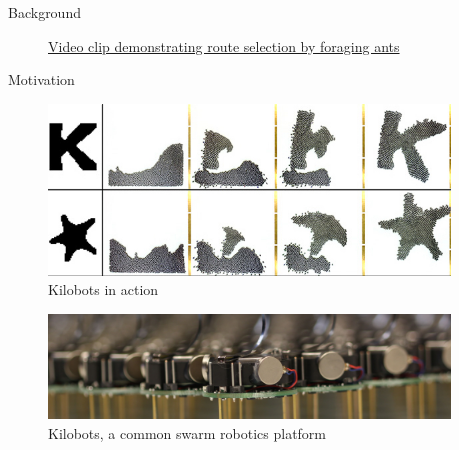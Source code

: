 
\begin{frame}{Background}
	\begin{figure}
		\begin{center}
		\end{center}
		\caption{\href{http://www.youtube.com/v/QeSErcTOLbY?rel=0&amp;showinfo=0}{Video clip demonstrating route selection by foraging ants}}
	\end{figure}
\end{frame}

\begin{frame}{Motivation}
\vspace{0.5em}

\begin{figure}
\begin{columns}%
        \begin{column}{0.75\textwidth}%
            \includegraphics[width=\textwidth,right]{images/Kilobots31}
        \end{column}%
        \begin{column}{0.25\textwidth}%
            \caption{Kilobots in action \scriptsize{\cite{mike_rubenstein_kilobots31_2014}}}
        \end{column}%
    \end{columns}
\end{figure}

\vspace{1.5em}
\begin{figure}
\begin{columns}%
        \begin{column}{0.75\textwidth}%
            \includegraphics[width=\textwidth,right]{images/kilobots}
        \end{column}%
        \begin{column}{0.25\textwidth}%
            \caption{Kilobots, a common swarm robotics platform \scriptsize{\cite{ssr_lab_harvard_university_swarm2.jpg_????}}}
        \end{column}%
    \end{columns}
\end{figure}

\end{frame}

